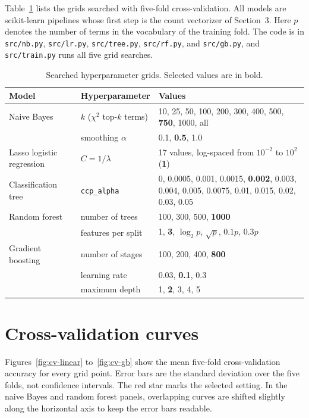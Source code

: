\documentclass[onecolumn]{jmlr}
\begin{document}
Table~\ref{tab:grids} lists the grids searched with five-fold cross-validation. All models are scikit-learn pipelines whose first step is the count vectorizer of Section~3. Here $p$ denotes the number of terms in the vocabulary of the training fold. The code is in \texttt{src/nb.py}, \texttt{src/lr.py}, \texttt{src/tree.py}, \texttt{src/rf.py}, and \texttt{src/gb.py}, and \texttt{src/train.py} runs all five grid searches.

\begin{table}[ht]
\centering
\caption{Searched hyperparameter grids. Selected values are in bold.}
\label{tab:grids}
\small
\begin{tabular}{@{}p{3.0cm}p{3.6cm}p{7.2cm}@{}}
\toprule
Model & Hyperparameter & Values \\
\midrule
Naive Bayes & $k$ ($\chi^2$ top-$k$ terms) & 10, 25, 50, 100, 200, 300, 400, 500, \textbf{750}, 1000, all \\
 & smoothing $\alpha$ & 0.1, \textbf{0.5}, 1.0 \\
\midrule
Lasso logistic regression & $C=1/\lambda$ & 17 values, log-spaced from $10^{-2}$ to $10^{2}$ (\textbf{1}) \\
\midrule
Classification tree & \texttt{ccp\_alpha} & 0, 0.0005, 0.001, 0.0015, \textbf{0.002}, 0.003, 0.004, 0.005, 0.0075, 0.01, 0.015, 0.02, 0.03, 0.05 \\
\midrule
Random forest & number of trees & 100, 300, 500, \textbf{1000} \\
 & features per split & 1, \textbf{3}, $\log_2 p$, $\sqrt{p}$, $0.1p$, $0.3p$ \\
\midrule
Gradient boosting & number of stages & 100, 200, 400, \textbf{800} \\
 & learning rate & 0.03, \textbf{0.1}, 0.3 \\
 & maximum depth & 1, \textbf{2}, 3, 4, 5 \\
\bottomrule
\end{tabular}
\end{table}

\section{Cross-validation curves}
\label{app:curves}

Figures~\ref{fig:cv-linear} to~\ref{fig:cv-gb} show the mean five-fold cross-validation accuracy for every grid point. Error bars are the standard deviation over the five folds, not confidence intervals. The red star marks the selected setting. In the naive Bayes and random forest panels, overlapping curves are shifted slightly along the horizontal axis to keep the error bars readable.
\end{document}
